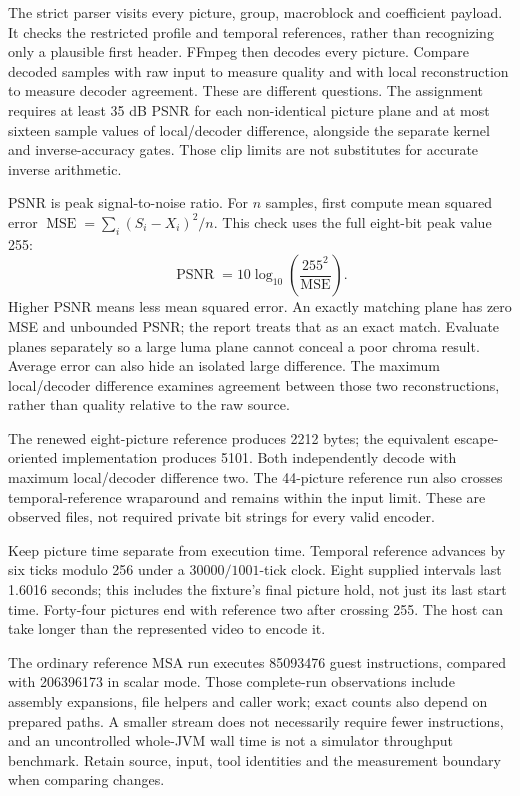 The strict parser visits every picture, group, macroblock and coefficient payload.
It checks the restricted profile and temporal references, rather than recognizing
only a plausible first header. FFmpeg then decodes every picture. Compare decoded
samples with raw input to measure quality and with local reconstruction to measure
decoder agreement. These are different questions. The assignment requires at least
35 dB PSNR for each non-identical picture plane and at most sixteen sample values
of local/decoder difference, alongside the separate kernel and inverse-accuracy
gates. Those clip limits are not substitutes for accurate inverse arithmetic.

PSNR is peak signal-to-noise ratio. For $n$ samples, first compute mean squared
error $\operatorname{MSE}=\sum_i(S_i-X_i)^2/n$. This check uses the full eight-bit
peak value 255:
\[
  \operatorname{PSNR}=10\log_{10}\!\left(\frac{255^2}{\operatorname{MSE}}\right).
\]
Higher PSNR means less mean squared error. An exactly matching plane has zero
MSE and unbounded PSNR; the report treats that as an exact match. Evaluate planes
separately so a large luma plane cannot conceal a poor chroma result. Average
error can also hide an isolated large difference. The maximum local/decoder
difference examines agreement between those two reconstructions, rather than
quality relative to the raw source.

The renewed eight-picture reference produces 2212 bytes; the equivalent
escape-oriented implementation produces 5101. Both independently decode with
maximum local/decoder difference two. The 44-picture reference run also crosses
temporal-reference wraparound and remains within the input limit. These are
observed files, not required private bit strings for every valid encoder.

Keep picture time separate from execution time. Temporal reference advances by
six ticks modulo 256 under a $30000/1001$-tick clock. Eight supplied intervals
last 1.6016 seconds; this includes the fixture's final picture hold, not just its
last start time. Forty-four pictures end with reference two after crossing 255.
The host can take longer than the represented video to encode it.

The ordinary reference MSA run executes 85093476 guest instructions, compared
with 206396173 in scalar mode. Those complete-run observations include assembly
expansions, file helpers and caller work; exact counts also depend on prepared
paths. A smaller stream does not necessarily require fewer instructions, and an
uncontrolled whole-JVM wall time is not a simulator throughput benchmark. Retain
source, input, tool identities and the measurement boundary when comparing changes.

